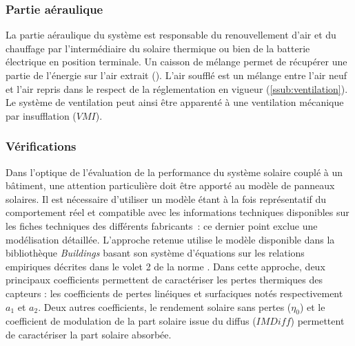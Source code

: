 \subsubsection{Partie aéraulique} %
\label{ssub:partie_aeraulique}
La partie aéraulique du système est responsable du renouvellement d’air et du chauffage
par l’intermédiaire du solaire thermique ou bien de la batterie électrique en
position terminale. Un caisson de mélange permet de récupérer une partie de l’énergie
sur l’air extrait (). L’air soufflé est un mélange entre
l’air neuf et l’air repris dans le respect de la réglementation en vigueur (\ref{ssub:ventilation}).
Le système de ventilation peut ainsi être apparenté à une ventilation mécanique par insufflation
($VMI$).


\subsubsection{Vérifications} %
\label{ssub:verifications}
Dans l’optique de l’évaluation de la performance  du système solaire couplé à un bâtiment,
une attention particulière doit être apporté au modèle de panneaux solaires. Il est
nécessaire d’utiliser un modèle étant à la fois représentatif du comportement réel et
compatible avec les informations techniques disponibles sur les fiches techniques des
différents fabricants~: ce dernier point exclue une modélisation détaillée. L’approche
retenue utilise le modèle disponible dans la bibliothèque \textit{Buildings} basant son
système d’équations sur les relations empiriques décrites dans le volet 2 de la norme
\textcite{EN129752}. Dans cette approche, deux principaux coefficients permettent de
caractériser les pertes thermiques des capteurs : les coefficients de pertes linéiques et
surfaciques notés respectivement $a_{1}$ et $a_{2}$. Deux autres coefficients, le rendement
solaire sans pertes ($\eta_{0}$) et le coefficient de modulation de la part solaire issue du diffus
($IMDiff$) permettent de caractériser la part solaire absorbée.

